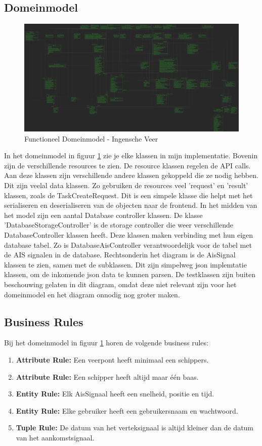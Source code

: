 \documentclass{article}
\begin{document}
\subsection{Domeinmodel}
\begin{figure}[H]
    \centering
    \includegraphics[width=1\textwidth]{images/FunctioneelKlassendiagram.png}
    \caption{Functioneel Domeinmodel - Ingensche Veer}
    \label{fig:dm}
\end{figure}
In het domeinmodel in figuur \ref{fig:dm} zie je elke klassen in mijn implementatie. Bovenin zijn de verschillende resources te zien. De resource klassen regelen de API calls. Aan deze klassen zijn verschillende andere klassen gekoppeld die ze nodig hebben. Dit zijn veelal data klassen. Zo gebruiken de resources veel 'request' en 'result' klassen, zoals de TaskCreateRequest. Dit is een simpele klasse die helpt met het serialiseren en deserialiseren van de objecten naar de frontend. 
In het midden van het model zijn een aantal Database controller klassen. De klasse 'DatabaseStorageController' is de storage controller die weer verschillende DatabaseController klassen heeft. Deze klassen maken verbinding met hun eigen database tabel. Zo is DatabaseAisController verantwoordelijk voor de tabel met de AIS signalen in de database.
Rechtsonderin het diagram is de AisSignal klassen te zien, samen met de subklassen. Dit zijn simpelweg json implemtatie klassen, om de inkomende json data te kunnen parsen.
De testklassen zijn buiten beschouwing gelaten in dit diagram, omdat deze niet relevant zijn voor het domeinmodel en het diagram onnodig nog groter maken.


\subsection{Business Rules}
Bij het domeinmodel in  figuur \ref{fig:dm} horen de volgende business rules:
\begin{enumerate}
    \item \textbf{Attribute Rule:} Een veerpont heeft minimaal een schippers.
    \item \textbf{Attribute Rule:} Een schipper heeft altijd maar één baas.
    \item \textbf{Entity Rule:} Elk AisSignaal heeft een snelheid, positie en tijd.
    \item \textbf{Entity Rule:} Elke gebruiker heeft een gebruikersnaam en wachtwoord.
    \item \textbf{Tuple Rule:} De datum van het verteksignaal is altijd kleiner dan de datum van het aankomstsignaal.
\end{enumerate} 
\end{document}
